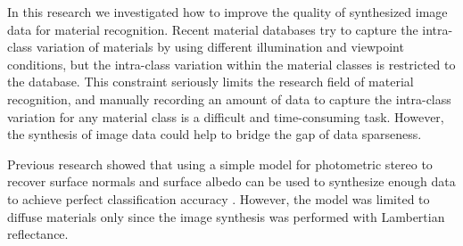 \hypertarget{conclusion}{
}


In this research we investigated how to improve the quality of synthesized image data for material recognition. Recent material databases try to capture the intra-class variation of materials by using different illumination and viewpoint conditions, but the intra-class variation within the material classes is restricted to the database. This constraint seriously limits the research field of material recognition, and manually recording an amount of data to capture the intra-class variation for any material class is a difficult and time-consuming task. However, the synthesis of image data could help to bridge the gap of data sparseness.

Previous research showed that using a simple model for photometric stereo to recover surface normals and surface albedo can be used to synthesize enough data to achieve perfect classification accuracy \cite{Targhi}. However, the model was limited to diffuse materials only since the image synthesis was performed with Lambertian reflectance.

